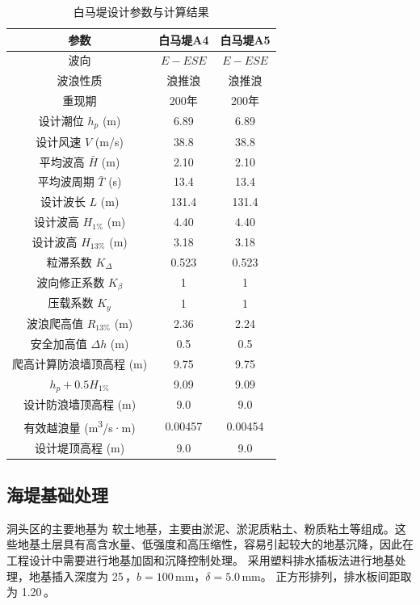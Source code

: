 \documentclass[UTF8, a4paper, 12pt]{ctexart} %
\begin{document}
\begin{table}[h]
    \centering
    \caption{白马堤设计参数与计算结果}
    \begin{tabular}{|c|c|c|}
        \hline
        \textbf{参数} & \textbf{白马堤A4} & \textbf{白马堤A5} \\ \hline
        波向 & $E-ESE$ & $E-ESE$ \\ \hline
        波浪性质 & 浪推浪 & 浪推浪 \\ \hline
        重现期 & 200年 & 200年 \\ \hline
        设计潮位 $h_p$ (m) & 6.89 & 6.89 \\ \hline
        设计风速 $V$ (m/s) & 38.8 & 38.8 \\ \hline
        平均波高 $\bar{H}$ (m) & 2.10 & 2.10 \\ \hline
        平均波周期 $\bar{T}$ (s) & 13.4 & 13.4 \\ \hline
        设计波长 $L$ (m) & 131.4 & 131.4 \\ \hline
        设计波高 $H_{1\%}$ (m) & 4.40 & 4.40 \\ \hline
        设计波高 $H_{13\%}$ (m) & 3.18 & 3.18 \\ \hline
        粒滞系数 $K_\Delta$ & 0.523 & 0.523 \\ \hline
        波向修正系数 $K_\beta$ & 1 & 1 \\ \hline
        压载系数 $K_y$ & 1 & 1 \\ \hline
        波浪爬高值 $R_{13\%}$ (m) & 2.36 & 2.24 \\ \hline
        安全加高值 $\Delta h$ (m) & 0.5 & 0.5 \\ \hline
        爬高计算防浪墙顶高程 (m) & 9.75 & 9.75 \\ \hline
        $h_p + 0.5H_{1\%}$ & 9.09 & 9.09 \\ \hline
        设计防浪墙顶高程 (m) & 9.0 & 9.0 \\ \hline
        有效越浪量 (m\textsuperscript{3}/s·m) & 0.00457 & 0.00454 \\ \hline
        设计堤顶高程 (m) & 9.0 & 9.0 \\ \hline
    \end{tabular}
    \label{tab:white_horse_dike_parameters}
\end{table}
\newpage

\subsection{海堤基础处理}
洞头区的主要地基为 软土地基，主要由淤泥、淤泥质粘土、粉质粘土等组成。这些地基土层具有高含水量、低强度和高压缩性，容易引起较大的地基沉降，因此在工程设计中需要进行地基加固和沉降控制处理。
采用塑料排水插板法进行地基处理，地基插入深度为 25\,，$b=100\,\text{mm}$，$\delta=5.0\,\text{mm}$。  
正方形排列，排水板间距取为 1.20\,。
\end{document}
